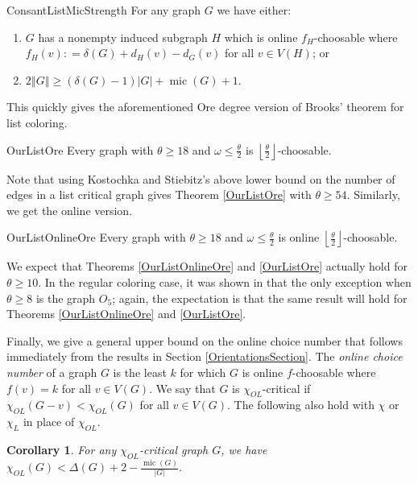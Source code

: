 \documentclass[12pt]{article}
\theoremstyle{plain}
\newtheorem{cor}[thm]{Corollary}
\theoremstyle{definition}
\theoremstyle{remark}
\newcommand{\card}[1]{\left|#1\right|}
\newcommand{\size}[1]{\left\Vert#1\right\Vert}
\newcommand{\floor}[1]{\left\lfloor#1\right\rfloor}
\newcommand{\DefinedAs}{\mathrel{\mathop:}=}
\newcommand{\mic}{\operatorname{mic}}
\begin{document}
\begin{repthm}{ConsantListMicStrength}
For any graph $G$ we have either:
\begin{enumerate}
\item $G$ has a nonempty induced subgraph $H$ which is online $f_H$-choosable where $f_H(v) \DefinedAs \delta(G) + d_H(v) - d_G(v)$ for all $v \in V(H)$; or
\item $2\size{G} \geq (\delta(G) - 1)\card{G} + \mic(G) + 1$.
\end{enumerate}
\end{repthm}

\noindent This quickly gives the aforementioned Ore degree version of Brooks' theorem for list coloring.

\begin{repthm}{OurListOre}
Every graph with $\theta \geq 18$ and $\omega \leq \frac{\theta}{2}$ is $\floor{\frac{\theta}{2}}$-choosable.
\end{repthm}

\noindent Note that using Kostochka and Stiebitz's above lower bound on the number of edges in a list critical graph gives Theorem \ref{OurListOre} with $\theta \geq 54$. Similarly, we get the online version.

\begin{repthm}{OurListOnlineOre}
Every graph with $\theta \geq 18$ and $\omega \leq \frac{\theta}{2}$ is online $\floor{\frac{\theta}{2}}$-choosable.
\end{repthm}

We expect that Theorems \ref{OurListOnlineOre} and \ref{OurListOre} actually hold for $\theta \geq 10$.  In the regular coloring case, it was shown in \cite{krs_one} that the only exception when $\theta \geq 8$ is the graph $O_5$; again, the expectation is that the same result will hold for Theorems \ref{OurListOnlineOre} and \ref{OurListOre}.

Finally, we give a general upper bound on the online choice number that follows immediately from the results in Section \ref{OrientationsSection}.  The \emph{online choice number} of a graph $G$ is the least $k$ for which $G$ is online $f$-choosable where $f(v) = k$ for all $v \in V(G)$.  We say that $G$ is $\chi_{OL}$-critical if $\chi_{OL}(G-v) < \chi_{OL}(G)$ for all $v \in V(G)$.  The following also hold with $\chi$ or $\chi_L$ in place of $\chi_{OL}$.

\begin{cor}\label{MicCor}
For any $\chi_{OL}$-critical graph $G$, we have $\chi_{OL}(G) < \Delta(G) + 2 - \frac{\mic(G)}{|G|}$.
\end{cor}
\end{document}
